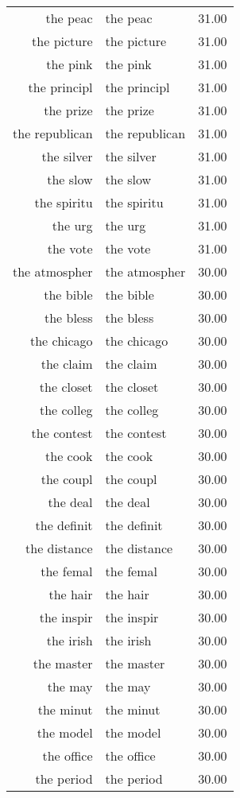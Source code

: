 \begin{table}[ht]
\begin{tabular}{rlr}
  the peac & the peac & 31.00 \\ 
  the picture & the picture & 31.00 \\ 
  the pink & the pink & 31.00 \\ 
  the principl & the principl & 31.00 \\ 
  the prize & the prize & 31.00 \\ 
  the republican & the republican & 31.00 \\ 
  the silver & the silver & 31.00 \\ 
  the slow & the slow & 31.00 \\ 
  the spiritu & the spiritu & 31.00 \\ 
  the urg & the urg & 31.00 \\ 
  the vote & the vote & 31.00 \\ 
  the atmospher & the atmospher & 30.00 \\ 
  the bible & the bible & 30.00 \\ 
  the bless & the bless & 30.00 \\ 
  the chicago & the chicago & 30.00 \\ 
  the claim & the claim & 30.00 \\ 
  the closet & the closet & 30.00 \\ 
  the colleg & the colleg & 30.00 \\ 
  the contest & the contest & 30.00 \\ 
  the cook & the cook & 30.00 \\ 
  the coupl & the coupl & 30.00 \\ 
  the deal & the deal & 30.00 \\ 
  the definit & the definit & 30.00 \\ 
  the distance & the distance & 30.00 \\ 
  the femal & the femal & 30.00 \\ 
  the hair & the hair & 30.00 \\ 
  the inspir & the inspir & 30.00 \\ 
  the irish & the irish & 30.00 \\ 
  the master & the master & 30.00 \\ 
  the may & the may & 30.00 \\ 
  the minut & the minut & 30.00 \\ 
  the model & the model & 30.00 \\ 
  the office & the office & 30.00 \\ 
  the period & the period & 30.00 \\ 

\end{tabular}
\end{table}
